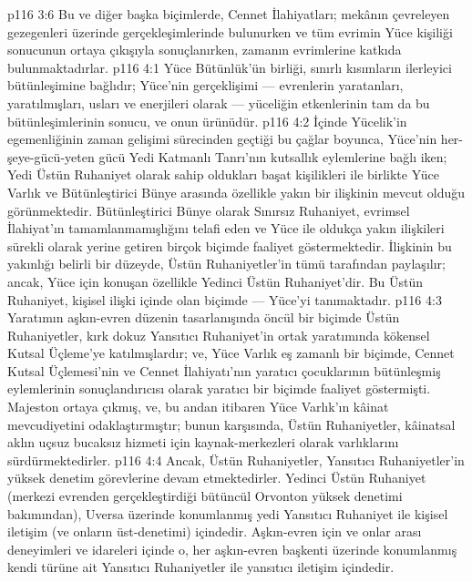 \vs p116 3:6 Bu ve diğer başka biçimlerde, Cennet İlahiyatları; mekânın çevreleyen gezegenleri üzerinde gerçekleşimlerinde bulunurken ve tüm evrimin Yüce kişiliği sonucunun ortaya çıkışıyla sonuçlanırken, zamanın evrimlerine katkıda bulunmaktadırlar.
\vs p116 4:1 Yüce Bütünlük’ün birliği, sınırlı kısımların ilerleyici bütünleşimine bağlıdır; Yüce’nin gerçeklişimi --- evrenlerin yaratanları, yaratılmışları, usları ve enerjileri olarak --- yüceliğin etkenlerinin tam da bu bütünleşimlerinin sonucu, ve onun ürünüdür.
\vs p116 4:2 İçinde Yücelik’in egemenliğinin zaman gelişimi sürecinden geçtiği bu çağlar boyunca, Yüce’nin her\hyp{}şeye\hyp{}gücü\hyp{}yeten gücü Yedi Katmanlı Tanrı’nın kutsallık eylemlerine bağlı iken; Yedi Üstün Ruhaniyet olarak sahip oldukları başat kişilikleri ile birlikte Yüce Varlık ve Bütünleştirici Bünye arasında özellikle yakın bir ilişkinin mevcut olduğu görünmektedir. Bütünleştirici Bünye olarak Sınırsız Ruhaniyet, evrimsel İlahiyat’ın tamamlanmamışlığını telafi eden ve Yüce ile oldukça yakın ilişkileri sürekli olarak yerine getiren birçok biçimde faaliyet göstermektedir. İlişkinin bu yakınlığı belirli bir düzeyde, Üstün Ruhaniyetler’in tümü tarafından paylaşılır; ancak, Yüce için konuşan özellikle Yedinci Üstün Ruhaniyet’dir. Bu Üstün Ruhaniyet, kişisel ilişki içinde olan biçimde --- Yüce’yi tanımaktadır.
\vs p116 4:3 Yaratımın aşkın\hyp{}evren düzenin tasarlanışında öncül bir biçimde Üstün Ruhaniyetler, kırk dokuz Yansıtıcı Ruhaniyet’in ortak yaratımında kökensel Kutsal Üçleme’ye katılmışlardır; ve, Yüce Varlık eş zamanlı bir biçimde, Cennet Kutsal Üçlemesi’nin ve Cennet İlahiyatı’nın yaratıcı çocuklarının bütünleşmiş eylemlerinin sonuçlandırıcısı olarak yaratıcı bir biçimde faaliyet göstermişti. Majeston ortaya çıkmış, ve, bu andan itibaren Yüce Varlık’ın kâinat mevcudiyetini odaklaştırmıştır; bunun karşısında, Üstün Ruhaniyetler, kâinatsal aklın uçsuz bucaksız hizmeti için kaynak\hyp{}merkezleri olarak varlıklarını sürdürmektedirler.
\vs p116 4:4 Ancak, Üstün Ruhaniyetler, Yansıtıcı Ruhaniyetler’in yüksek denetim görevlerine devam etmektedirler. Yedinci Üstün Ruhaniyet (merkezi evrenden gerçekleştirdiği bütüncül Orvonton yüksek denetimi bakımından), Uversa üzerinde konumlanmış yedi Yansıtıcı Ruhaniyet ile kişisel iletişim (ve onların üst\hyp{}denetimi) içindedir. Aşkın\hyp{}evren için ve onlar arası deneyimleri ve idareleri içinde o, her aşkın\hyp{}evren başkenti üzerinde konumlanmış kendi türüne ait Yansıtıcı Ruhaniyetler ile yansıtıcı iletişim içindedir.
